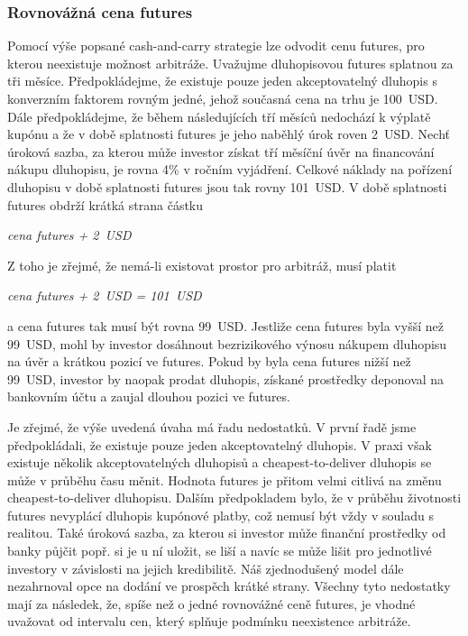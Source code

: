 \documentclass[a4paper]{book}
\begin{document}
\subsubsection{Rovnovážná cena futures}

Pomocí výše popsané cash-and-carry strategie lze odvodit cenu futures, pro kterou neexistuje možnost arbitráže. Uvažujme dluhopisovou futures splatnou za tři měsíce. Předpokládejme, že existuje pouze jeden akceptovatelný dluhopis s konverzním faktorem rovným jedné, jehož současná cena na trhu je 100~USD. Dále předpokládejme, že během následujících tří měsíců nedochází k výplatě kupónu a že  v době splatnosti futures je jeho naběhlý úrok roven 2~USD. Nechť úroková sazba, za kterou může investor získat tří měsíční úvěr na financování nákupu dluhopisu, je rovna 4\% v ročním vyjádření. Celkové náklady na pořízení dluhopisu v době splatnosti futures jsou tak rovny 101~USD. V době splatnosti futures obdrží krátká strana částku
\begin{center}
\textit{cena futures + 2~USD}
\end{center}
Z toho je zřejmé, že nemá-li existovat prostor pro arbitráž, musí platit
\begin{center}
\textit{cena futures + 2~USD = 101~USD}
\end{center}
a cena futures tak musí být rovna 99~USD. Jestliže cena futures byla vyšší než 99~USD, mohl by investor dosáhnout bezrizikového výnosu nákupem dluhopisu na úvěr a krátkou pozicí ve futures. Pokud by byla cena futures nižší než 99~USD, investor by naopak prodat dluhopis, získané prostředky deponoval na bankovním účtu a zaujal dlouhou pozici ve futures.

Je zřejmé, že výše uvedená úvaha má řadu nedostatků. V první řadě jsme předpokládali, že existuje pouze jeden akceptovatelný dluhopis. V praxi však existuje několik akceptovatelných dluhopisů a cheapest-to-deliver dluhopis se může v průběhu času měnit. Hodnota futures je přitom velmi citlivá na změnu cheapest-to-deliver dluhopisu. Dalším předpokladem bylo, že v průběhu životnosti futures nevyplácí dluhopis kupónové platby, což nemusí být vždy v souladu s realitou. Také úroková sazba, za kterou si investor může finanční prostředky od banky půjčit popř. si je u ní uložit, se liší a navíc se může lišit pro jednotlivé investory v závislosti na jejich kredibilitě. Náš zjednodušený model dále nezahrnoval opce na dodání ve prospěch krátké strany. Všechny tyto nedostatky mají za následek, že, spíše než o jedné rovnovážné ceně futures, je vhodné uvažovat od intervalu cen, který splňuje podmínku neexistence arbitráže.
\end{document}
